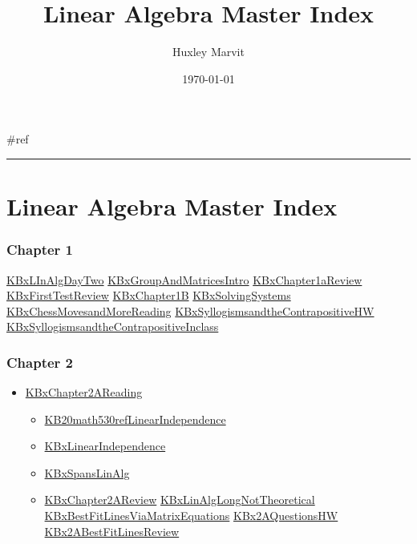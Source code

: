 \documentclass[letterpaper]{article}
\author{Huxley Marvit}
\date{\today}
\title{Linear Algebra Master Index}
\renewcommand{\tableofcontents}{}
\begin{document}
\tableofcontents

\#ref

\noindent\rule{\textwidth}{0.5pt}

\section{Linear Algebra Master Index}
\label{sec:org8ef6cdf}
\subsubsection{Chapter 1}
\label{sec:orgde173bd}
\href{KBxLInAlgDayTwo.org}{KBxLInAlgDayTwo}
\href{KBxGroupAndMatricesIntro.org}{KBxGroupAndMatricesIntro}
\href{KBxChapter1aReview.org}{KBxChapter1aReview}
\href{KBxFirstTestReview.org}{KBxFirstTestReview}
\href{KBxChapter1B.org}{KBxChapter1B}
\href{KBxSolvingSystems.org}{KBxSolvingSystems}
\href{KBxChessMovesandMoreReading.org}{KBxChessMovesandMoreReading}
\href{KBxSyllogismsandtheContrapositiveHW.org}{KBxSyllogismsandtheContrapositiveHW}
\href{KBxSyllogismsandtheContrapositiveInclass.org}{KBxSyllogismsandtheContrapositiveInclass}

\subsubsection{Chapter 2}
\label{sec:org69a98a2}
\begin{itemize}
\item \href{KBxChapter2AReading.org}{KBxChapter2AReading}

\begin{itemize}
\item \href{KB20math530refLinearIndependence.org}{KB20math530refLinearIndependence}
\item \href{KBxLinearIndependence.org}{KBxLinearIndependence}
\item \href{KBxSpansLinAlg.org}{KBxSpansLinAlg}
\item \href{KBxChapter2AReview.org}{KBxChapter2AReview}
\href{KBxLinAlgLongNotTheoretical.org}{KBxLinAlgLongNotTheoretical}
\href{KBxBestFitLinesViaMatrixEquations.org}{KBxBestFitLinesViaMatrixEquations}
\href{KBx2AQuestionsHW.org}{KBx2AQuestionsHW}
\href{KBx2ABestFitLinesReview.org}{KBx2ABestFitLinesReview}
\end{itemize}
\end{itemize}
\end{document}
